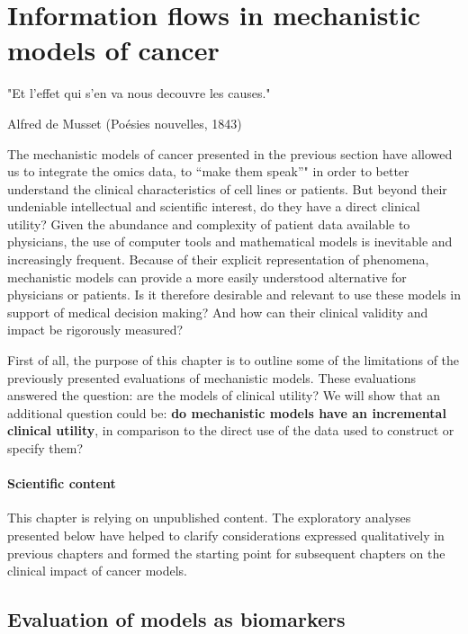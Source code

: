\documentclass[a4paper,12pt,twoside,onecolumn,openright,final,oldfontcommands]{memoir}
\newcommand{\initial}[1]{
	\lettrine[lines=3,lhang=0.33,nindent=0em]{
		\color{gray}
     		{\textsc{#1}}}{}}
\let\BeginKnitrBlock\begin \let\EndKnitrBlock\end
\begin{document}
\chapter{Information flows in mechanistic models of
cancer}\label{information-flows-in-mechanistic-models-of-cancer}

\epigraph{"Et l'effet qui s'en va nous decouvre les causes."}{Alfred de Musset (Poésies nouvelles, 1843)}

\initial{T}he mechanistic models of cancer presented in the previous
section have allowed us to integrate the omics data, to ``make them
speak''" in order to better understand the clinical characteristics of
cell lines or patients. But beyond their undeniable intellectual and
scientific interest, do they have a direct clinical utility? Given the
abundance and complexity of patient data available to physicians, the
use of computer tools and mathematical models is inevitable and
increasingly frequent. Because of their explicit representation of
phenomena, mechanistic models can provide a more easily understood
alternative for physicians or patients. Is it therefore desirable and
relevant to use these models in support of medical decision making? And
how can their clinical validity and impact be rigorously measured?

First of all, the purpose of this chapter is to outline some of the
limitations of the previously presented evaluations of mechanistic
models. These evaluations answered the question: are the models of
clinical utility? We will show that an additional question could be:
\textbf{do mechanistic models have an incremental clinical utility}, in
comparison to the direct use of the data used to construct or specify
them?

\BeginKnitrBlock{summarybox}
\subsubsection*{Scientific content}\label{scientific-content-4}

This chapter is relying on unpublished content. The exploratory analyses
presented below have helped to clarify considerations expressed
qualitatively in previous chapters and formed the starting point for
subsequent chapters on the clinical impact of cancer models.
\EndKnitrBlock{summarybox}

\section{Evaluation of models as
biomarkers}\label{evaluation-of-models-as-biomarkers}
\end{document}
